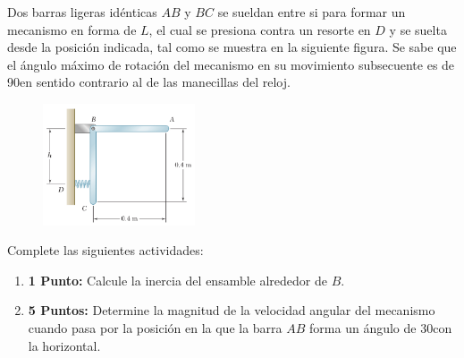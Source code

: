 \documentclass[ a4paper, twoside, 11pt]{article}
\begin{document}
\begin{problem}
Dos barras ligeras id\'enticas $AB$ y $BC$ se sueldan entre si para formar un mecanismo en forma de $L$, el cual se presiona contra un resorte en $D$ y se suelta desde la posici\'on indicada, tal como se muestra en la siguiente figura. Se sabe que el \'angulo m\'aximo de rotaci\'on del mecanismo en su movimiento subsecuente es de 90\deg en sentido contrario al de las manecillas del reloj. 

\begin{figure}[htb]
\centering
\includegraphics[width=0.4\textwidth]{problema-04.jpg}
\end{figure}

Complete las siguientes actividades: 
\begin{enumerate}[label=\textbf{\alph*)}]
\item \textbf{1 Punto:} Calcule la inercia del ensamble alrededor de $B$. 
\item \textbf{5 Puntos:} Determine la magnitud de la velocidad angular del mecanismo cuando pasa por la posici\'on en la que la barra $AB$ forma un \'angulo de 30\deg con la horizontal. 
\end{enumerate}

\end{problem}
\fullskip
\end{document}
